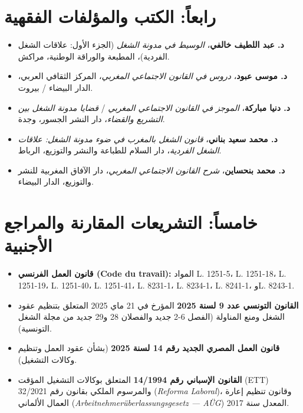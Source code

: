 \section*{رابعاً: الكتب والمؤلفات الفقهية}
\begin{itemize}[leftmargin=*, itemsep=5pt]
    \item \textbf{د. عبد اللطيف خالفي}، \textit{الوسيط في مدونة الشغل} (الجزء الأول: علاقات الشغل الفردية)، المطبعة والوراقة الوطنية، مراكش.
    \item \textbf{د. موسى عبود}، \textit{دروس في القانون الاجتماعي المغربي}، المركز الثقافي العربي، الدار البيضاء / بيروت.
    \item \textbf{د. دنيا مباركة}، \textit{الموجز في القانون الاجتماعي المغربي} / \textit{قضايا مدونة الشغل بين التشريع والقضاء}، دار النشر الجسور، وجدة.
    \item \textbf{د. محمد سعيد بناني}، \textit{قانون الشغل بالمغرب في ضوء مدونة الشغل: علاقات الشغل الفردية}، دار السلام للطباعة والنشر والتوزيع، الرباط.
    \item \textbf{د. محمد بنحساين}، \textit{شرح القانون الاجتماعي المغربي}، دار الآفاق المغربية للنشر والتوزيع، الدار البيضاء.
\end{itemize}

\section*{خامساً: التشريعات المقارنة والمراجع الأجنبية}
\begin{itemize}[leftmargin=*, itemsep=5pt]
    \item \textbf{قانون العمل الفرنسي (\textenglish{Code du travail}):} المواد \textenglish{L. 1251-5}، \textenglish{L. 1251-18}، \textenglish{L. 1251-19}، \textenglish{L. 1251-40}، \textenglish{L. 1251-41}، \textenglish{L. 8231-1}، \textenglish{L. 8234-1}، \textenglish{L. 8241-1}، و\textenglish{L. 8243-1}.
    \item \textbf{القانون التونسي عدد \textenglish{9} لسنة \textenglish{2025}} المؤرخ في \textenglish{21} ماي \textenglish{2025} المتعلق بتنظيم عقود الشغل ومنع المناولة (الفصل \textenglish{6-2} جديد والفصلان \textenglish{28} و\textenglish{29} جديد من مجلة الشغل التونسية).
    \item \textbf{قانون العمل المصري الجديد رقم \textenglish{14} لسنة \textenglish{2025}} (بشأن عقود العمل وتنظيم وكالات التشغيل).
    \item \textbf{القانون الإسباني رقم \textenglish{14/1994}} المتعلق بوكالات التشغيل المؤقت (\textenglish{ETT}) والمرسوم الملكي بقانون رقم \textenglish{32/2021} (\textenglish{\textit{Reforma Laboral}})، وقانون تنظيم إعارة العمال الألماني (\textenglish{\textit{Arbeitnehmerüberlassungsgesetz --- AÜG}}) المعدل سنة \textenglish{2017}.
\end{itemize}

